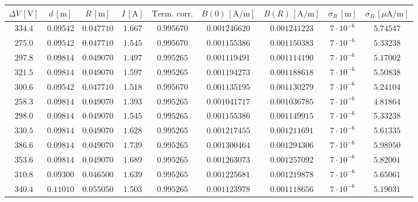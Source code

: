 \documentclass[]{article}
\begin{document}
    \begin{table}[H]
        \centering

    \begin{tabular}{||c|c|c|c|c|c|c|c|c||}
        \hline
        $\Delta V\, [\text{V}] $ & $d\, [\text{m}] $ & $R\, [\text{m}] $ & $I\, [\text{A}] $ & $\text{Term. corr.}$ & $B(0)\, [\text{A/m}] $ & $B(R)\, [\text{A/m}] $ & $ \sigma_R \, [\text{m}] $ & $ \sigma_B \, [\mu\text{A/m}] $ \\
        \hline\hline


 
        $334.4$ & $0.09542$ & $0.047710$ & $1.667$ & $0.995670$ & $0.001246620$ & $0.001241223$ & $7 \cdot 10^{-6}$ & $5.74547$ \\\hline
        $275.0$ & $0.09542$ & $0.047710$ & $1.545$ & $0.995670$ & $0.001155386$ & $0.001150383$ & $7 \cdot 10^{-6}$ & $5.33238$ \\\hline
        $297.8$ & $0.09814$ & $0.049070$ & $1.497$ & $0.995265$ & $0.001119491$ & $0.001114190$ & $7 \cdot 10^{-6}$ & $5.17002$ \\\hline
        $321.5$ & $0.09814$ & $0.049070$ & $1.597$ & $0.995265$ & $0.001194273$ & $0.001188618$ & $7 \cdot 10^{-6}$ & $5.50838$ \\\hline
        $300.6$ & $0.09542$ & $0.047710$ & $1.518$ & $0.995670$ & $0.001135195$ & $0.001130279$ & $7 \cdot 10^{-6}$ & $5.24104$ \\\hline
        $258.3$ & $0.09814$ & $0.049070$ & $1.393$ & $0.995265$ & $0.001041717$ & $0.001036785$ & $7 \cdot 10^{-6}$ & $4.81864$ \\\hline
        $298.0$ & $0.09814$ & $0.049070$ & $1.545$ & $0.995265$ & $0.001155386$ & $0.001149915$ & $7 \cdot 10^{-6}$ & $5.33238$ \\\hline
        $330.5$ & $0.09814$ & $0.049070$ & $1.628$ & $0.995265$ & $0.001217455$ & $0.001211691$ & $7 \cdot 10^{-6}$ & $5.61335$ \\\hline
        $386.6$ & $0.09814$ & $0.049070$ & $1.739$ & $0.995265$ & $0.001300464$ & $0.001294306$ & $7 \cdot 10^{-6}$ & $5.98950$ \\\hline
        $353.6$ & $0.09814$ & $0.049070$ & $1.689$ & $0.995265$ & $0.001263073$ & $0.001257092$ & $7 \cdot 10^{-6}$ & $5.82001$ \\\hline
        $310.8$ & $0.09300$ & $0.046500$ & $1.639$ & $0.995265$ & $0.001225681$ & $0.001219878$ & $7 \cdot 10^{-6}$ & $5.65061$ \\\hline
        $340.4$ & $0.11010$ & $0.055050$ & $1.503$ & $0.995265$ & $0.001123978$ & $0.001118656$ & $7 \cdot 10^{-6}$ & $5.19031$ \\\hline

\end{tabular}
\end{table}
\end{document}
